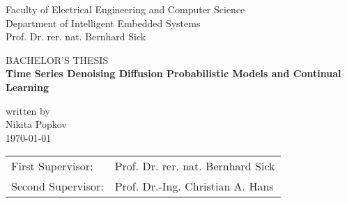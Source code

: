 %
%

\begin{titlepage}
    \begin{center}
    

    \vspace*{0.5cm}

    \large{Faculty of Electrical Engineering and Computer Science}\\
    \vspace*{0.5cm} \large{Department of Intelligent Embedded Systems\\ Prof.
    Dr. rer. nat. Bernhard Sick}

    \vspace*{2cm}
    \large {BACHELOR'S THESIS}\\
    \vspace*{1cm} \Huge {\textbf{Time Series Denoising Diffusion Probabilistic Models and Continual Learning} }\\
    \vspace*{1cm}

    \normalsize{written by} \\
    \large{Nikita Popkov} \\
    \vspace*{1.5cm} \normalsize{\today}

    \vspace*{1cm}

        \begin{center}
            \begin{tabular}{ll}
             First Supervisor: & Prof. Dr. rer. nat. Bernhard Sick\\
             Second Supervisor: & Prof. Dr.-Ing. Christian A. Hans \\
            \end{tabular}
        \end{center}

    \end{center}
\end{titlepage}
